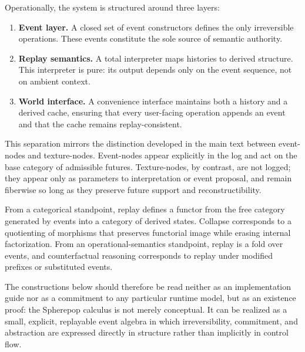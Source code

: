 \documentclass[11pt]{article}
\begin{document}
Operationally, the system is structured around three layers:

\begin{enumerate}
\item \textbf{Event layer.} A closed set of event constructors defines the only
irreversible operations. These events constitute the sole source of semantic
authority.
\item \textbf{Replay semantics.} A total interpreter maps histories to derived
structure. This interpreter is pure: its output depends only on the event
sequence, not on ambient context.
\item \textbf{World interface.} A convenience interface maintains both a history
and a derived cache, ensuring that every user-facing operation appends an event
and that the cache remains replay-consistent.
\end{enumerate}

This separation mirrors the distinction developed in the main text between
event-nodes and texture-nodes. Event-nodes appear explicitly in the log and act
on the base category of admissible futures. Texture-nodes, by contrast, are not
logged; they appear only as parameters to interpretation or event proposal, and
remain fiberwise so long as they preserve future support and reconstructibility.

From a categorical standpoint, replay defines a functor from the free category
generated by events into a category of derived states. Collapse corresponds to a
quotienting of morphisms that preserves functorial image while erasing internal
factorization. From an operational-semantics standpoint, replay is a fold over
events, and counterfactual reasoning corresponds to replay under modified
prefixes or substituted events.

The constructions below should therefore be read neither as an implementation
guide nor as a commitment to any particular runtime model, but as an existence
proof: the Spherepop calculus is not merely conceptual. It can be realized as a
small, explicit, replayable event algebra in which irreversibility, commitment,
and abstraction are expressed directly in structure rather than implicitly in
control flow.
\end{document}

